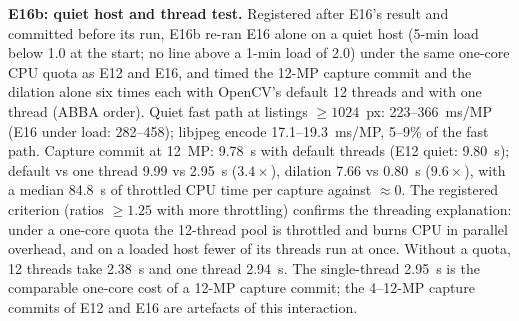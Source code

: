 \documentclass[10pt]{article}
\begin{document}
\textbf{E16b: quiet host and thread test.} Registered after E16's result and committed before its run, E16b re-ran E16
alone on a quiet host (5-min load below 1.0 at the start; no line above a 1-min load of 2.0)
under the same one-core CPU quota as E12 and E16, and timed the 12-MP capture commit and the dilation alone six times
each with OpenCV's default 12 threads and with one thread (ABBA order). Quiet fast path at listings $\ge1024$~px:
223--366~ms/MP (E16 under load: 282--458); libjpeg encode 17.1--19.3~ms/MP, 5--9\% of the fast path. Capture commit at
12~MP: 9.78~s with default threads (E12 quiet: 9.80~s); default vs one thread 9.99 vs 2.95~s ($3.4\times$), dilation
7.66 vs 0.80~s ($9.6\times$), with a median 84.8~s of throttled CPU time per capture against $\approx0$. The registered
criterion (ratios $\ge1.25$ with more throttling) confirms the threading explanation: under a one-core quota the
12-thread pool is throttled and burns CPU in parallel overhead, and on a loaded host fewer of its threads run at once.
Without a quota, 12 threads take 2.38~s and one thread 2.94~s. The single-thread 2.95~s is the comparable one-core cost
of a 12-MP capture commit; the 4--12-MP capture commits of E12 and E16 are artefacts of this interaction.
\end{document}
